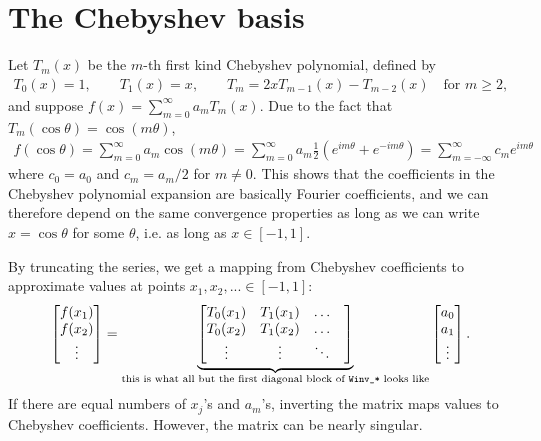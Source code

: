\section{The Chebyshev basis}
\label{sec-cheb_basis}

Let $T_m(x)$ be the $m$-th first kind Chebyshev polynomial, defined by
\begin{align*}
 T_0(x) = 1, \qquad T_1(x) = x, \qquad T_m = 2xT_{m-1}(x) - T_{m-2}(x)
 \quad\text{for }m \ge 2,
\end{align*}
and suppose
$f(x) = \sum_{m=0}^\infty a_m T_m(x)$.
Due to the fact that $T_m(\cos\theta) = \cos(m\theta)$, 
\begin{align*}
 f(\cos\theta) = \sum_{m=0}^\infty a_m \cos(m\theta) 
               = \sum_{m=0}^\infty a_m \frac{1}{2}
                 \left(e^{im\theta} + e^{-im\theta}\right)
               = \sum_{m=-\infty}^\infty c_m e^{im\theta}
\end{align*}
where $c_0 = a_0$ and $c_m = a_m/2$ for $m \neq 0$. This shows
that the coefficients in the Chebyshev polynomial expansion are
basically Fourier coefficients, and we can therefore depend
on the same convergence properties as long as we can write
$x = \cos\theta$ for some $\theta$, i.e. as long as
$x \in [-1,1]$.

By truncating the series, we get a mapping from Chebyshev
coefficients to approximate values at points
$x_1,x_2,... \in [-1,1]$:
\begin{align*}
 \begin{bmatrix}
  f(x_1) \\ f(x_2) \\ \vdots \\ 
 \end{bmatrix}
 = 
 \underbrace{
 \begin{bmatrix}
  T_0(x_1) & T_1(x_1) & \hdots & \\
  T_0(x_2) & T_1(x_2) & \hdots & \\ 
   \vdots  & \vdots   & \ddots & 
 \end{bmatrix}
 }_{\text{this is what all but the first diagonal block of {\tt Winv\_*} looks like}}
 \begin{bmatrix}
  a_0 \\ a_1 \\ \vdots \\ 
 \end{bmatrix}.
\end{align*}
If there are equal numbers of $x_j$'s and $a_m$'s, inverting the matrix maps
values to Chebyshev coefficients. 
However, the matrix can be nearly singular.

